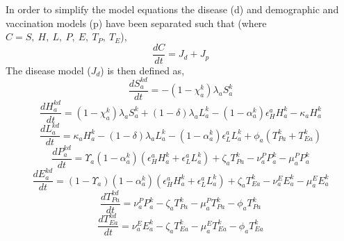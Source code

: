 \documentclass[11pt,twoside]{bristolthesis}
\begin{document}
  In order to simplify the model equations the disease (d) and demographic and vaccination models (p) have been separated such that (where \(C = S,\ H,\ L,\ P,\ E,\ T_P,\ T_E\)),
  \begin{equation}
  \frac{dC}{dt} =  J_{d} + J_{p}
    \label{eq:split-models}
  \end{equation}
  The disease model (\(J_{d}\)) is then defined as,
  \begin{equation}
  \frac{dS^{kd}_{a}}{dt} = - (1 - \chi^k_a)\lambda_a S^k_a 
    \label{eq:sus-model}
  \end{equation}
  \begin{equation}
  \frac{dH^{kd}_{a}}{dt} = (1 - \chi^k_a)\lambda_a S^k_a + (1 - \delta)\lambda_a L^k_{a} - (1 - \alpha^k_a)\epsilon^a_H H^{k}_{a} - \kappa_a H^{k}_{a}
    \label{eq:high-model}
  \end{equation}
  \begin{equation}
  \frac{dL^{kd}_{a}}{dt} =  \kappa_a H^{k}_{a} - (1 - \delta)\lambda_a L^k_{a} - (1 - \alpha^k_a) \epsilon^a_L L^{k}_{a} + \phi_a (T^{k}_{Pa} + T^{k}_{Ea})
    \label{eq:low-model}
  \end{equation}
  \begin{equation}
  \frac{dP^{kd}_a}{dt} =  \Upsilon_a(1 - \alpha^k_a)(\epsilon^a_HH^{k}_{a}  + \epsilon^a_LL^{k}_{a}) + \zeta_a T^{k}_{Pa} - \nu_a^P P^{k}_a - \mu^P_a P^{k}_a
    \label{eq:pul-model}
  \end{equation}
  \begin{equation}
  \frac{dE^{kd}_a}{dt} =  (1 - \Upsilon_a)(1 - \alpha^k_a)(\epsilon^a_HH^{k}_{a}  + \epsilon^a_LL^{k}_{a}) + \zeta_a T^{k}_{Ea} - \nu_a^E E^{k}_a - \mu^E_a E^{k}_a
    \label{eq:extra-pul-model}
  \end{equation}
  \begin{equation}
  \frac{dT^{kd}_{Pa}}{dt} = \nu_a^P P^{k}_a - \zeta_a T^{k}_{Pa} - \mu^P_a T^{k}_{Pa} - \phi_a T^{k}_{Pa}
    \label{eq:pul-treat-model}
  \end{equation}
  \begin{equation}
  \frac{dT^{kd}_{Ea}}{dt} = \nu_a^E E^{k}_a - \zeta_a T^{k}_{Ea} - \mu^E_a T^{k}_{Ea} - \phi_a T^{k}_{Ea}
    \label{eq:extra-pul-treat-model}
  \end{equation}
\end{document}
